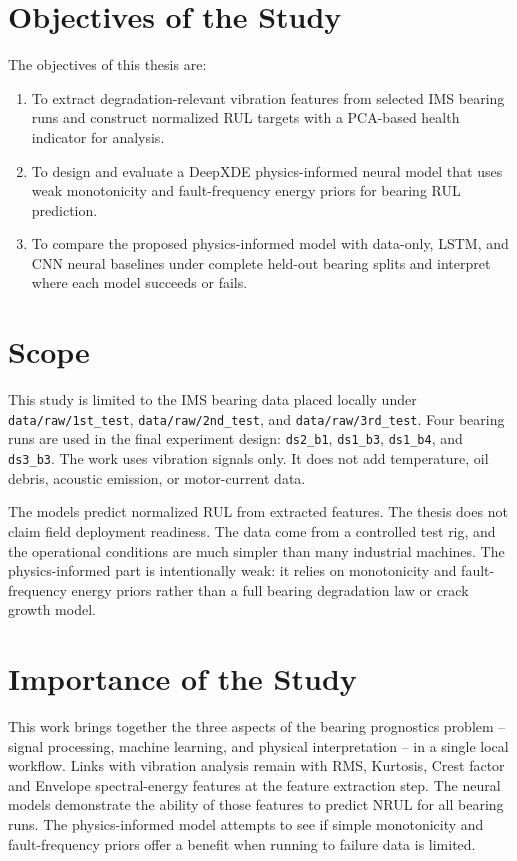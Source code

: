 \section{Objectives of the Study}

The objectives of this thesis are:

\begin{enumerate}[label=\arabic*.]
    \item To extract degradation-relevant vibration features from selected IMS bearing runs and construct normalized RUL targets with a PCA-based health indicator for analysis.
    \item To design and evaluate a DeepXDE physics-informed neural model that uses weak monotonicity and fault-frequency energy priors for bearing RUL prediction.
    \item To compare the proposed physics-informed model with data-only, LSTM, and CNN neural baselines under complete held-out bearing splits and interpret where each model succeeds or fails.
\end{enumerate}

\section{Scope}

This study is limited to the IMS bearing data placed locally under \texttt{data/raw/1st\_test}, \texttt{data/raw/2nd\_test}, and \texttt{data/raw/3rd\_test}. Four bearing runs are used in the final experiment design: \texttt{ds2\_b1}, \texttt{ds1\_b3}, \texttt{ds1\_b4}, and \texttt{ds3\_b3}. The work uses vibration signals only. It does not add temperature, oil debris, acoustic emission, or motor-current data.

The models predict normalized RUL from extracted features. The thesis does not claim field deployment readiness. The data come from a controlled test rig, and the operational conditions are much simpler than many industrial machines. The physics-informed part is intentionally weak: it relies on monotonicity and fault-frequency energy priors rather than a full bearing degradation law or crack growth model.

\section{Importance of the Study}

This work brings together the three aspects of the bearing prognostics problem – signal processing, machine learning, and physical interpretation – in a single local workflow. Links with vibration analysis remain with RMS, Kurtosis, Crest factor and Envelope spectral-energy features at the feature extraction step. The neural models demonstrate the ability of those features to predict NRUL for all bearing runs. The physics-informed model attempts to see if simple monotonicity and fault-frequency priors offer a benefit when running to failure data is limited.

